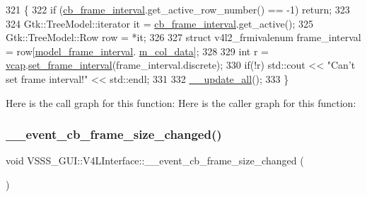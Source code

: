 \begin{DoxyCode}
321                                                          \{
322         \textcolor{keywordflow}{if} (\hyperlink{class_v_s_s_s___g_u_i_1_1_v4_l_interface_ad07b3bbad672e676e128f19a12f07e73}{cb\_frame\_interval}.get\_active\_row\_number() == -1) \textcolor{keywordflow}{return};
323 
324         Gtk::TreeModel::iterator it = \hyperlink{class_v_s_s_s___g_u_i_1_1_v4_l_interface_ad07b3bbad672e676e128f19a12f07e73}{cb\_frame\_interval}.get\_active();
325         Gtk::TreeModel::Row row = *it;
326 
327         \textcolor{keyword}{struct }v4l2\_frmivalenum frame\_interval = row[\hyperlink{class_v_s_s_s___g_u_i_1_1_v4_l_interface_ae6a12566332a48cf41aa8d4bbea6671e}{model\_frame\_interval}.
      \hyperlink{class_v_s_s_s___g_u_i_1_1_v4_l_interface_1_1_model_column_aa6720e1b3e47adb85d36c3ec3a2bb262}{m\_col\_data}];
328 
329         \textcolor{keywordtype}{int} r = \hyperlink{class_v_s_s_s___g_u_i_1_1_v4_l_interface_a7ece61f4ccc6d5321c445e60f34e7f33}{vcap}.\hyperlink{classv4lcap_a698e7d4dcefeda932ecbab7bfccdc491}{set\_frame\_interval}(frame\_interval.discrete);
330         \textcolor{keywordflow}{if}(!r) std::cout << \textcolor{stringliteral}{"Can't set frame interval!"} << std::endl;
331 
332         \hyperlink{class_v_s_s_s___g_u_i_1_1_v4_l_interface_ac3fe0a20fd30c6e9505eb375ef63e52e}{\_\_update\_all}();
333     \}
\end{DoxyCode}
Here is the call graph for this function\+:
Here is the caller graph for this function\+:
\mbox{\label{class_v_s_s_s___g_u_i_1_1_v4_l_interface_a49e6f69de18f2bcb54db964375535e9f}} 
\subsubsection{\texorpdfstring{\+\_\+\+\_\+event\+\_\+cb\+\_\+frame\+\_\+size\+\_\+changed()}{\_\_event\_cb\_frame\_size\_changed()}}
{\footnotesize\ttfamily void V\+S\+S\+S\+\_\+\+G\+U\+I\+::\+V4\+L\+Interface\+::\+\_\+\+\_\+event\+\_\+cb\+\_\+frame\+\_\+size\+\_\+changed (\begin{DoxyParamCaption}{ }\end{DoxyParamCaption})}



